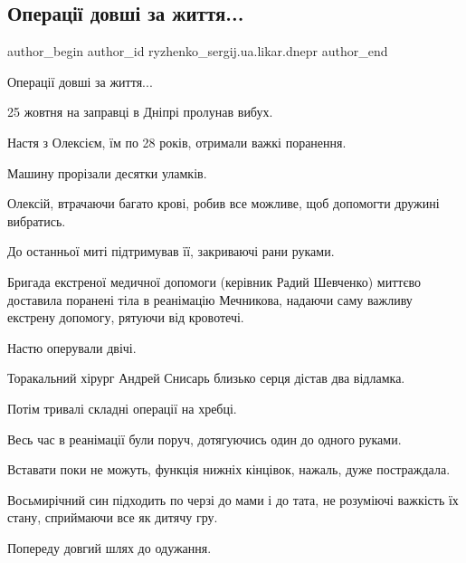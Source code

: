  
 
 
 
 

\subsection{Операції довші за життя...}
\label{sec:01_11_2022.fb.ryzhenko_sergij.ua.likar.dnepr.1.operats__dovsh__za_}

\ifcmt
 author_begin
   author_id ryzhenko_sergij.ua.likar.dnepr
 author_end
\fi

Операції довші за життя...

25 жовтня на заправці в Дніпрі пролунав вибух.

Настя з Олексієм, їм по 28 років, отримали важкі поранення.

Машину прорізали десятки уламків.

Олексій, втрачаючи багато крові, робив все можливе, щоб допомогти дружині
вибратись.

До останньої миті підтримував її, закриваючі рани руками.

Бригада екстреної медичної допомоги (керівник Радий Шевченко) миттєво доставила
поранені тіла в реанімацію Мечникова, надаючи саму важливу екстрену допомогу,
рятуючи від кровотечі.

Настю оперували двічі.

Торакальний хірург Андрей Снисарь близько серця дістав два відламка.

Потім тривалі складні операції на хребці.

Весь час в реанімації були поруч, дотягуючись один до одного руками.

Вставати поки не можуть, функція нижніх кінцівок, нажаль, дуже постраждала.

Восьмирічний син підходить по черзі до мами і до тата, не розуміючі важкість їх
стану, сприймаючи все як дитячу гру.

Попереду довгий шлях до одужання.

